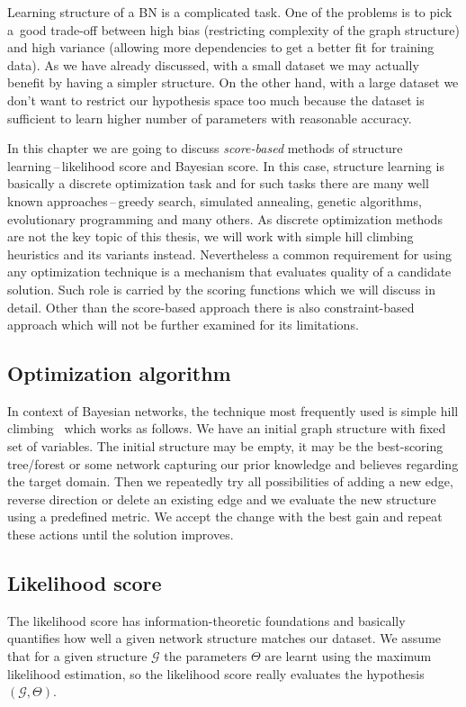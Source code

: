 \documentclass[english,cover]{fitthesis} %
\newcommand{\term}[1]{\emph{#1}}           %
\begin{document}
Learning structure of a BN is a complicated task. One of the problems is to pick a~good trade-off between high bias (restricting complexity of the graph structure) and high variance (allowing more dependencies to get a better fit for training data). As we have already discussed, with a small dataset we may actually benefit by having a simpler structure. On the other hand, with a large dataset we don't want to restrict our hypothesis space too much because the dataset is sufficient to learn higher number of parameters with reasonable accuracy.

In this chapter we are going to discuss \term{score-based} methods of structure learning\,--\,likelihood score and Bayesian score. In this case, structure learning is basically a discrete optimization task and for such tasks there are many well known approaches\,--\,greedy search, simulated annealing, genetic algorithms, evolutionary programming and many others. As discrete optimization methods are not the key topic of this thesis, we will work with simple hill climbing heuristics and its variants instead. Nevertheless a common requirement for using any optimization technique is a mechanism that evaluates quality of a candidate solution. Such role is carried by the scoring functions which we will discuss in detail.
Other than the score-based approach there is also constraint-based approach which will not be further examined for its limitations. %


\subsection{Optimization algorithm}
In context of Bayesian networks, the technique most frequently used is simple hill climbing~\cite[p.~816]{pgm} which works as follows. We have an initial graph structure with fixed set of variables. The initial structure may be empty, it may be the best-scoring tree/forest or some network capturing our prior knowledge and believes regarding the target domain. Then we repeatedly try all possibilities of adding a new edge, reverse direction or delete an existing edge and we evaluate the new structure using a predefined metric. We accept the change with the best gain and repeat these actions until the solution improves. %



\subsection{Likelihood score}
The likelihood score has information-theoretic foundations and basically quantifies how well a given network structure matches our dataset. We assume that for a given structure $\mathcal{G}$ the parameters $\Theta$ are learnt using the maximum likelihood estimation, so the likelihood score really evaluates the hypothesis $(\mathcal{G}, \Theta)$.
\end{document}

